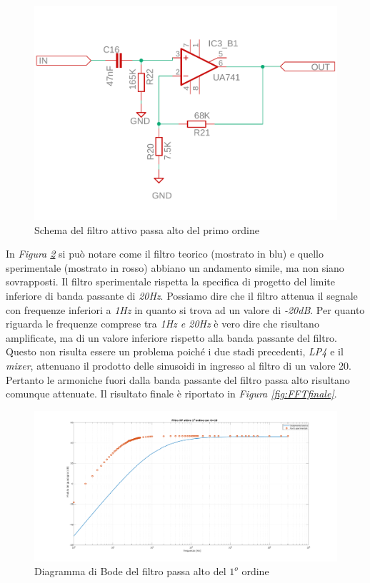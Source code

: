 \documentclass[titlepage]{report}
\begin{document}
	\begin{figure}[H]
		\centering
		\includegraphics[scale=0.5]{Immagini/sch_hp1.pdf}
		\caption{Schema del filtro attivo passa alto del primo ordine}
		\label{fig:sch_hp1}
	\end{figure}

	In \textit{Figura \ref{fig:BODEHp1Real}} si può notare come il filtro teorico (mostrato in blu) e quello sperimentale (mostrato in rosso) abbiano un andamento simile, ma non siano sovrapposti. Il filtro sperimentale rispetta la specifica di progetto del limite inferiore di banda passante di \textit{20Hz}. Possiamo dire che il filtro attenua il segnale con frequenze inferiori a \textit{1Hz} in quanto si trova ad un valore di \textit{-20dB}. Per quanto riguarda le frequenze comprese tra \textit{1Hz e 20Hz} è vero dire che risultano amplificate, ma di un valore inferiore rispetto alla banda passante del filtro. Questo non risulta essere un problema poiché i due stadi precedenti, \textit{LP4} e il \textit{mixer}, attenuano il prodotto delle sinusoidi in ingresso al filtro di un valore 20. Pertanto le armoniche fuori dalla banda passante del filtro passa alto risultano comunque attenuate. Il risultato finale è riportato in \textit{Figura \ref{fig:FFTfinale}}.

	\begin{figure}[H]
		\centering
		\includegraphics[scale=0.34]{Immagini/bode_hp1_ua741.pdf}
		\caption{Diagramma di Bode del filtro passa alto del $1^o$ ordine}
		\label{fig:BODEHp1Real}
	\end{figure}
\end{document}
